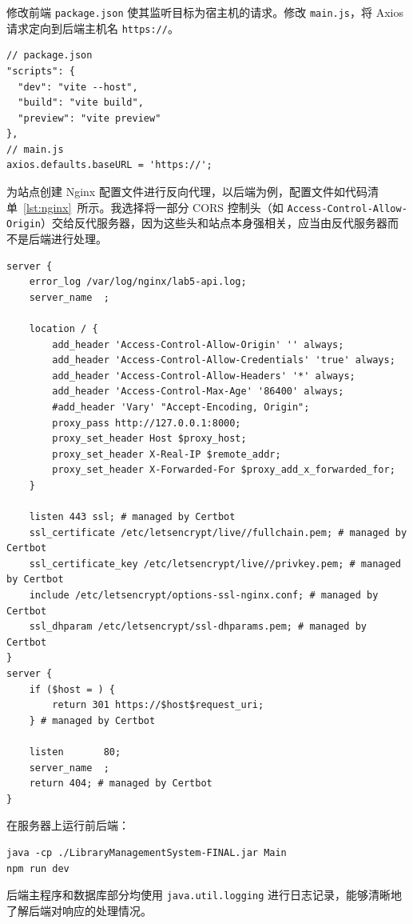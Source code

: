 \documentclass[a4paper,oneside]{ctexbook}
\begin{document}
修改前端 \verb|package.json| 使其监听目标为宿主机的请求。修改 \verb|main.js|，将 Axios 请求定向到后端主机名 \verb|https://|。

\begin{lstlisting}[caption=前端配置,label=lst:front]
// package.json
"scripts": {
  "dev": "vite --host",
  "build": "vite build",
  "preview": "vite preview"
},
// main.js
axios.defaults.baseURL = 'https://';
\end{lstlisting}

为站点创建 Nginx 配置文件进行反向代理，以后端为例，配置文件如代码清单~\ref{lst:nginx}~所示。我选择将一部分 CORS 控制头（如 \verb|Access-Control-Allow-Origin|）交给反代服务器，因为这些头和站点本身强相关，应当由反代服务器而不是后端进行处理。

\begin{lstlisting}[caption=Nginx 反代,label=lst:nginx]
server {
    error_log /var/log/nginx/lab5-api.log;
    server_name  ;

    location / {
        add_header 'Access-Control-Allow-Origin' '' always;
        add_header 'Access-Control-Allow-Credentials' 'true' always;
        add_header 'Access-Control-Allow-Headers' '*' always;
        add_header 'Access-Control-Max-Age' '86400' always;
        #add_header 'Vary' "Accept-Encoding, Origin";
        proxy_pass http://127.0.0.1:8000;
        proxy_set_header Host $proxy_host;
        proxy_set_header X-Real-IP $remote_addr;
        proxy_set_header X-Forwarded-For $proxy_add_x_forwarded_for;
    }

    listen 443 ssl; # managed by Certbot
    ssl_certificate /etc/letsencrypt/live//fullchain.pem; # managed by Certbot
    ssl_certificate_key /etc/letsencrypt/live//privkey.pem; # managed by Certbot
    include /etc/letsencrypt/options-ssl-nginx.conf; # managed by Certbot
    ssl_dhparam /etc/letsencrypt/ssl-dhparams.pem; # managed by Certbot
}
server {
    if ($host = ) {
        return 301 https://$host$request_uri;
    } # managed by Certbot

    listen       80;
    server_name  ;
    return 404; # managed by Certbot
}
\end{lstlisting}

在服务器上运行前后端：

\begin{lstlisting}[language=xml, caption=pom.xml,label=lst:pom]
java -cp ./LibraryManagementSystem-FINAL.jar Main
npm run dev
\end{lstlisting}

后端主程序和数据库部分均使用 \verb|java.util.logging| 进行日志记录，能够清晰地了解后端对响应的处理情况。
\end{document}
